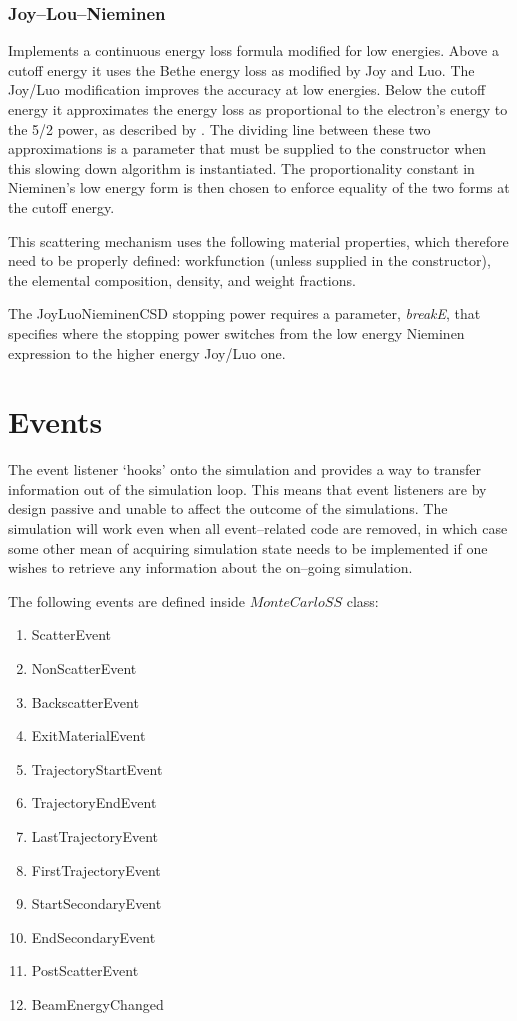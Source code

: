 \subsubsection{Joy--Lou--Nieminen}
Implements a continuous energy loss formula modified for low energies. Above a cutoff energy it uses the Bethe energy loss as modified by Joy and Luo. The Joy/Luo modification improves the accuracy at low energies. Below the cutoff energy it approximates the energy loss as proportional to the electron's energy to the 5/2 power, as described by \cite{Nieminen}. The dividing line between these two approximations is a parameter that must be supplied to the constructor when this slowing down algorithm is instantiated. The proportionality constant in Nieminen's low energy form is then chosen to enforce equality of the two forms at the cutoff energy. 

This scattering mechanism uses the following material properties, which therefore need to be properly defined: workfunction (unless supplied in the constructor), the elemental composition, density, and weight fractions. 

The JoyLuoNieminenCSD stopping power requires a parameter, \textit{breakE}, that specifies where the stopping power switches from the low energy Nieminen expression to the higher energy Joy/Luo one.

\section{Events}\label{impl:events}
The event listener `hooks' onto the simulation and provides a way to transfer information out of the simulation loop. This means that event listeners are by design passive and unable to affect the outcome of the simulations. The simulation will work even when all event--related code are removed, in which case some other mean of acquiring simulation state needs to be implemented if one wishes to retrieve any information about the on--going simulation.

The following events are defined inside $MonteCarloSS$ class:
\begin{enumerate}
\item ScatterEvent
\item NonScatterEvent
\item BackscatterEvent
\item ExitMaterialEvent
\item TrajectoryStartEvent
\item TrajectoryEndEvent
\item LastTrajectoryEvent
\item FirstTrajectoryEvent
\item StartSecondaryEvent
\item EndSecondaryEvent
\item PostScatterEvent
\item BeamEnergyChanged
\end{enumerate}


